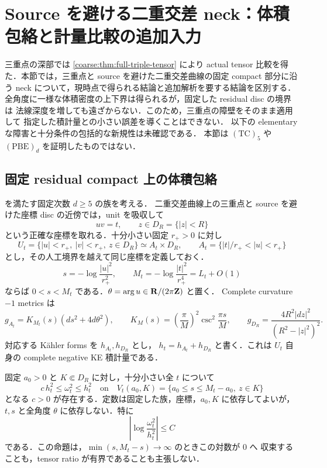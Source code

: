 \section{Source を避ける二重交差 neck：体積包絡と計量比較の追加入力}
\label{neck:sec:comparison-inputs}

三重点の深部では \cref{coarse:thm:full-triple-tensor} により actual tensor
比較を得た．本節では，三重点と source を避けた二重交差曲線の固定 compact
部分に沿う neck について，現時点で得られる結論と追加解析を要する結論を区別する．
全角度に一様な体積密度の上下界は得られるが，固定した residual disc の境界は
法線深度を増しても遠ざからない．このため，三重点の障壁をそのまま適用して
指定した積計量との小さい誤差を導くことはできない．
以下の elementary な障害と十分条件の包括的な新規性は未確認である．
本節は $\mathrm{(TC)}_5$ や $\mathrm{(PBE)}_d$ を証明したものではない．

\subsection{固定 residual compact 上の体積包絡}

 を満たす固定次数 $d\ge5$ の族を考える．
二重交差曲線上の三重点と source を避けた座標 disc の近傍では，unit を吸収して
\[
 uv=t,\qquad z\in D_R=\{|z|<R\}
\]
という正確な座標を取れる．十分小さい固定 $r_+>0$ に対し
\[
 U_t=\{|u|<r_+,\ |v|<r_+,\ z\in D_R\}
     \simeq A_t\times D_R,
 \qquad A_t=\{|t|/r_+<|u|<r_+\}
\]
とし，その人工境界を越えて同じ座標を定義しておく．
\[
 s=-\log\frac{|u|^2}{r_+^2},\qquad
 M_t=-\log\frac{|t|^2}{r_+^4}=L_t+O(1)
\]
ならば $0<s<M_t$ である．$\theta=\arg u\in\mathbf R/(2\pi\mathbf Z)$ と置く．
Complete curvature $-1$ metrics は
\begin{equation}\label{neck:eq:annulus-disc-background}
 g_{A_t}=K_{M_t}(s)(ds^2+4d\theta^2),\qquad
 K_M(s)=\left(\frac\pi M\right)^2
             \csc^2\frac{\pi s}{M},\qquad
 g_{D_R}=\frac{4R^2|dz|^2}{(R^2-|z|^2)^2}.
\end{equation}
対応する K\"ahler forms を $h_{A_t},h_{D_R}$ とし，
$h_t=h_{A_t}+h_{D_R}$ と書く．これは $U_t$ 自身の complete negative KE
積計量である．

\begin{proposition}
\label{neck:prop:volume-envelope}
固定 $a_0>0$ と $K\Subset D_R$ に対し，十分小さい全 $t$ について
\begin{equation}\label{neck:eq:volume-envelope}
 c\,h_t^2\le\omega_t^2\le h_t^2
 \quad\text{on}\quad
 V_t(a_0,K)=\{a_0\le s\le M_t-a_0,\ z\in K\}
\end{equation}
となる $c>0$ が存在する．定数は固定した族，座標，$a_0,K$ に依存してよいが，
$t,s$ と全角度 $\theta$ に依存しない．特に
\[
 \left|\log\frac{\omega_t^2}{h_t^2}\right|\le C
\]
である．この命題は，$\min(s,M_t-s)\to\infty$ のときこの対数が $0$ へ
収束することも，tensor ratio が有界であることも主張しない．
\end{proposition}

